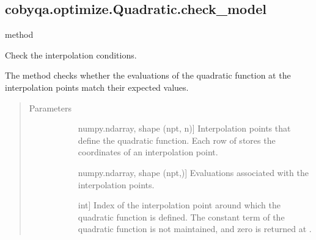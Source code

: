 \documentclass[letterpaper,10pt,english]{sphinxmanual}
\begin{document}
\begin{fulllineitems}
\begin{fulllineitems}
\begin{quote}
\begin{description}
\end{description}\end{quote}

\end{fulllineitems}



\subsection{cobyqa.optimize.Quadratic.check\_model}
\label{\detokenize{refs/generated/cobyqa.optimize.Quadratic.check_model:cobyqa-optimize-quadratic-check-model}}\label{\detokenize{refs/generated/cobyqa.optimize.Quadratic.check_model::doc}}
\sphinxAtStartPar
method

\begin{fulllineitems}
\label{\detokenize{refs/generated/cobyqa.optimize.Quadratic.check_model:cobyqa.optimize.Quadratic.check_model}}
\sphinxAtStartPar
Check the interpolation conditions.

\sphinxAtStartPar
The method checks whether the evaluations of the quadratic function at
the interpolation points match their expected values.
\begin{quote}\begin{description}
\item[{Parameters}] \leavevmode\begin{description}
\item[{}] \leavevmode{[}numpy.ndarray, shape (npt, n){]}
\sphinxAtStartPar
Interpolation points that define the quadratic function. Each row of
 stores the coordinates of an interpolation point.

\item[{}] \leavevmode{[}numpy.ndarray, shape (npt,){]}
\sphinxAtStartPar
Evaluations associated with the interpolation points.

\item[{}] \leavevmode{[}int{]}
\sphinxAtStartPar
Index of the interpolation point around which the quadratic function
is defined. The constant term of the quadratic function is not
maintained, and zero is returned at .


\end{description}
\end{description}
\end{quote}
\end{fulllineitems}
\end{fulllineitems}
\end{document}
